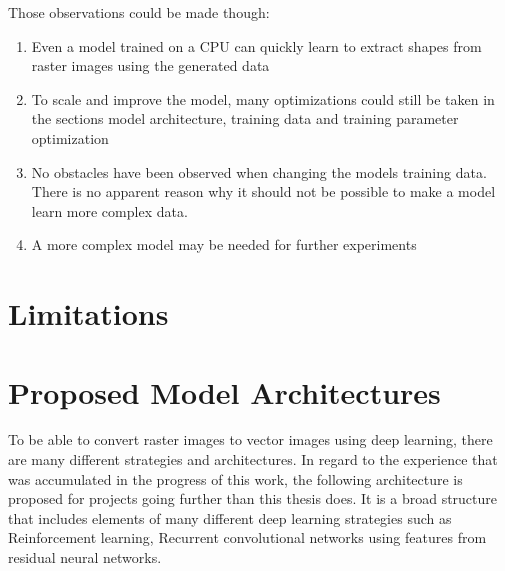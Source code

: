 \documentclass[12pt, a4paper, titlepage]{report}
\begin{document}
Those observations could be made though:

\begin{enumerate}[label=\Roman*]
   \item Even a model trained on a CPU can quickly learn to extract shapes from raster images using the generated data
   \item To scale and improve the model, many optimizations could still be taken in the sections model architecture, training data and training parameter optimization
   \item No obstacles have been observed when changing the models training data. There is no apparent reason why it should not be possible to make a model learn more complex data.
   \item A more complex model may be needed for further experiments
\end{enumerate}


\section{Limitations}

\section{Proposed Model Architectures}

To be able to convert raster images to vector images using deep learning, there are many different strategies and architectures. In regard to the experience that was accumulated in the progress of this work, the following architecture is proposed for projects going further than this thesis does. It is a broad structure that includes elements of many different deep learning strategies such as Reinforcement learning, Recurrent convolutional networks using features from residual neural networks.
\end{document}
